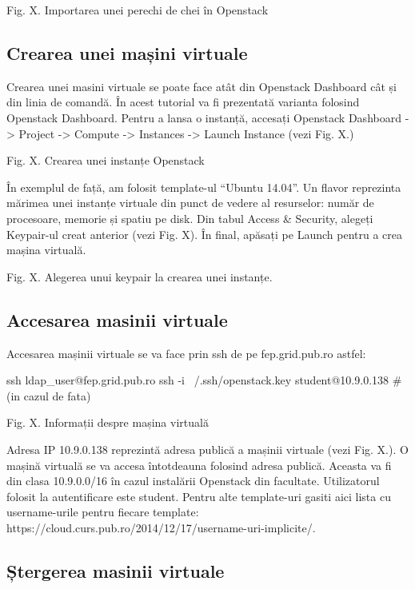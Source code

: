 Fig. X. Importarea unei perechi de chei în Openstack

\subsection{Crearea unei mașini virtuale}
\label{sec:vm-openstack-createvm}

Crearea unei masini virtuale se poate face atât din Openstack Dashboard cât și
din linia de comandă. În acest tutorial va fi prezentată varianta folosind
Openstack Dashboard. Pentru a lansa o instanță, accesați Openstack Dashboard ->
Project -> Compute -> Instances -> Launch Instance (vezi Fig. X.)

Fig. X. Crearea unei instanțe Openstack

În exemplul de față, am folosit template-ul “Ubuntu 14.04”. Un flavor reprezinta
mărimea unei instanțe virtuale din punct de vedere al resurselor: număr de
procesoare, memorie și spatiu pe disk. Din tabul Access \& Security, alegeți
Keypair-ul creat anterior (vezi Fig. X). În final, apăsați pe Launch pentru a
crea mașina virtuală.

Fig. X. Alegerea unui keypair la crearea unei instanțe.

\subsection{Accesarea masinii virtuale}
\label{sec:vm-openstack-accessvm}

Accesarea mașinii virtuale se va face prin ssh de pe fep.grid.pub.ro astfel:

\begin{screen}
ssh ldap_user@fep.grid.pub.ro
ssh -i ~/.ssh/openstack.key student@10.9.0.138 #(in cazul de fata)
\end{screen}

Fig. X. Informații despre mașina virtuală

Adresa IP 10.9.0.138 reprezintă adresa publică a mașinii virtuale (vezi Fig.
X.). O mașină virtuală se va accesa întotdeauna folosind adresa publică. Aceasta
va fi din clasa 10.9.0.0/16 în cazul instalării Openstack din facultate.
Utilizatorul folosit la autentificare este student. Pentru alte template-uri
gasiti aici lista cu username-urile pentru fiecare template:
https://cloud.curs.pub.ro/2014/12/17/username-uri-implicite/.

\subsection{Ștergerea masinii virtuale}
\label{sec:vm-openstack-deletevm}

